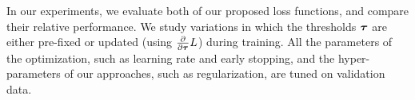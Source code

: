 \documentclass{article}
\newcommand{\sameer}[1]{\todo[color=blue!20]{\textbf{s:} #1}{}}
\newcommand{\para}[1]{\vspace{2mm}\noindent\textbf{#1}:}
\begin{document}
In our experiments, we evaluate both of our proposed loss functions, and compare their relative performance.
%
We study variations in which the thresholds ${\boldsymbol{\tau}}$ are either pre-fixed or updated (using $\frac{\partial}{\partial{\boldsymbol{\tau}}}L$) during training.
All the parameters of the optimization, such as learning rate and early stopping, and the hyper-parameters of our approaches, such as regularization, are tuned on validation data.





\end{document}
